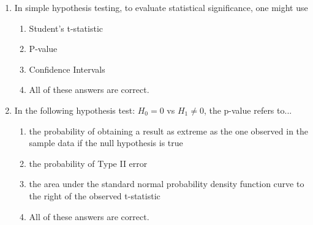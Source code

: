 \documentclass{article}
\begin{document}
\begin{enumerate}
\item In simple hypothesis testing, to evaluate statistical significance, one might use

\begin{enumerate}[label=\alph*)]
\item Student's t-statistic
\item P-value
\item Confidence Intervals
\item All of these answers are correct.
\end{enumerate}\vspace{.25cm}

\item In the following hypothesis test: $H_0 = 0$ vs $H_1 \neq 0$, the p-value refers to...

\begin{enumerate}[label=\alph*)]
\item the probability of obtaining a result as extreme as the one observed in the sample data if the null hypothesis is true
\item the probability of Type II error
\item the area under the standard normal probability density function curve to the right of the observed t-statistic
\item All of these answers are correct.
\end{enumerate}\vspace{.25cm}


\end{enumerate}\vspace{.25cm}
\end{document}

